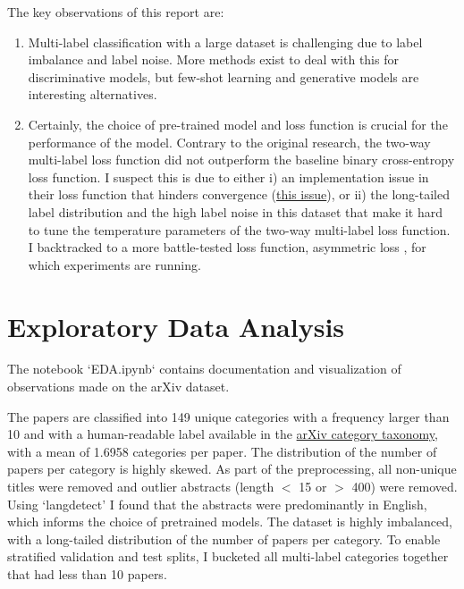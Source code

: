 \documentclass[11pt,letterpaper]{article}
\begin{document}
\noindent The key observations of this report are:
\begin{enumerate}
  [label=\Roman*.,leftmargin=2\parindent]
  \item Multi-label classification with a large dataset is challenging due to label imbalance and label noise. More methods exist to deal with this for discriminative models, but few-shot learning and generative models are interesting alternatives.
\item Certainly, the choice of pre-trained model and loss function is crucial for the performance of the model. Contrary to the original research, the two-way multi-label loss function did not outperform the baseline binary cross-entropy loss function. I suspect this is due to either i) an implementation issue in their loss function that hinders convergence (\eg \href{https://github.com/tk1980/TwoWayMultiLabelLoss/issues/2}{this issue}), or ii) the long-tailed label distribution and the high label noise in this dataset that make it hard to tune the temperature parameters of the two-way multi-label loss function. I backtracked to a more battle-tested loss function, asymmetric loss \cite{ridnik2021asymmetric}, for which experiments are running.
\end{enumerate}

\section{Exploratory Data Analysis}

The notebook `EDA.ipynb` contains documentation and visualization of observations made on the arXiv dataset.

The papers are classified into 149 unique categories with a frequency larger than 10 and with a human-readable label available in the \href{https://arxiv.org/category_taxonomy}{arXiv category taxonomy}, with a mean of 1.6958 categories per paper. The distribution of the number of papers per category is highly skewed.
As part of the preprocessing, all non-unique titles were removed and outlier abstracts (length $<$ 15 or $>$ 400) were removed. Using `langdetect' I found that the abstracts were predominantly in English, which informs the choice of pretrained models. The dataset is highly imbalanced, with a long-tailed distribution of the number of papers per category. To enable stratified validation and test splits, I bucketed all multi-label categories together that had less than 10 papers.
\end{document}
